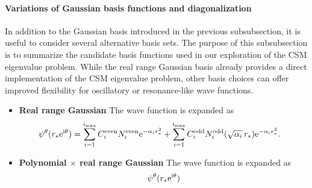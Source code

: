 \paragraph{Variations of Gaussian basis functions and diagonalization}
In addition to the Gaussian basis introduced in the previous subsubsection, it is
useful to consider several alternative basis sets.
The purpose of this subsubsection is to summarize the candidate basis functions
used in our exploration of the CSM eigenvalue problem.
While the real range Gaussian basis already provides a direct implementation of
the CSM eigenvalue problem, other basis choices can offer improved flexibility
for oscillatory or resonance-like wave functions.
\begin{itemize}
    \item \textbf{Real range Gaussian}
    The wave function is expanded as
    \begin{align}
        \psi^\theta(r_* \mathrm{e}^{\mathrm{i}\theta})
        &=
        \sum_{i=1}^{i_{\max}}
        C^{\mathrm{even}}_i N^{\mathrm{even}}_i \mathrm{e}^{-\alpha_i r_*^2}
        +
        \sum_{i=1}^{i_{\max}}
        C^{\mathrm{odd}}_i N^{\mathrm{odd}}_i (\sqrt{\alpha_i}\, r_*) \mathrm{e}^{-\alpha_i r_*^2}.
    \end{align}
    \item \textbf{Polynomial $\times$ real range Gaussian}
    The wave function is expanded as
    \begin{align}
        \psi^\theta(r_* \rme^{\rmi\theta})

\end{align}
\end{itemize}
